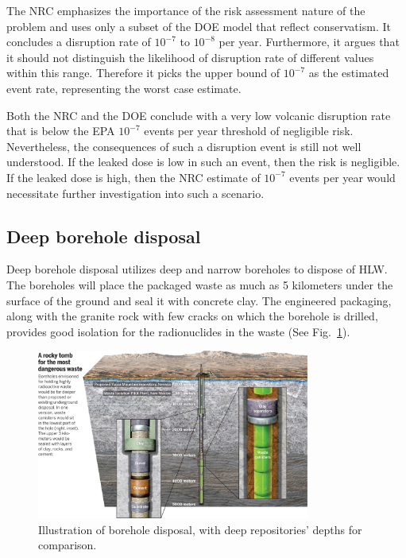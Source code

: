 \documentclass[nofootinbib,preprint,aps]{revtex4-1}
\begin{document}
        The NRC emphasizes the importance of the risk assessment nature of the problem and uses only a subset
        of the DOE model that reflect conservatism. It concludes a disruption rate of
        $10^{-7}$ to $10^{-8}$ per year. Furthermore, it argues that it should not distinguish the likelihood
        of disruption rate of different values within this range. Therefore it picks the upper bound
        of $10^{-7}$ as the estimated event rate, representing the worst case estimate.

        Both the NRC and the DOE conclude with a very low volcanic disruption rate that is below the EPA
        $10^{-7}$ events per year threshold of negligible risk.
        Nevertheless, the consequences of such a disruption event is still not well understood.
        If the leaked dose is low in such an event, then the risk is negligible. If the leaked dose is high,
        then the NRC estimate of $10^{-7}$ events per year would necessitate further investigation into such
        a scenario.\cite{cv14}
        \subsection{Deep borehole disposal}
        Deep borehole disposal utilizes deep and narrow boreholes to dispose of HLW. The boreholes
        will place the packaged waste as much as 5 kilometers under the surface of the ground and seal it
        with concrete clay.
        The engineered packaging, along with the granite rock with few cracks on which the borehole is drilled,
        provides
        good isolation for the radionuclides in the waste (See Fig.~\ref{fig:borehole}).
        \begin{figure}[h]
            \centering
            \includegraphics[width=0.8\textwidth]{borehole.jpg}
            \caption{Illustration of borehole disposal, with deep repositories' depths for comparison.\cite{c15}}
            \label{fig:borehole}
        \end{figure}
\end{document}
